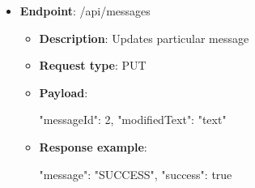 \begin{itemize}
\begin{itemize}
        \item \textbf{Payload}:

        \begin{spverbatim}
        {
            "content": "hello world",
            "chatId": 4
        }
        \end{spverbatim}

        \item \textbf{Response example}:

        \begin{spverbatim}
        {
            "chatMessage": {
            "userDisplayName": "string",
            "messageText": "string",
            "sentAt": "time-stamp",
            "editedAt": "time-stamp"
        },
            "message": "SUCCESS",
            "success": true
        }
        \end{spverbatim}

        \item \textbf{Response codes}: 200, 400, 401

        \item \textbf{Response messages}:
        \begin{enumerate}
            \item Success.
            \item User not found.
        \end{enumerate}
    \end{itemize}

    \item \textbf{Endpoint}: /api/messages

    \begin{itemize}
        \item \textbf{Description}: Updates particular message

        \item \textbf{Request type}: PUT

        \item \textbf{Payload}:

        \begin{spverbatim}
        {
            "messageId": 2,
            "modifiedText": "text"
        }
        \end{spverbatim}

        \item \textbf{Response example}:

        \begin{spverbatim}
        {
            "message": "SUCCESS",
            "success": true
        }
        \end{spverbatim}


\end{itemize}
\end{itemize}
